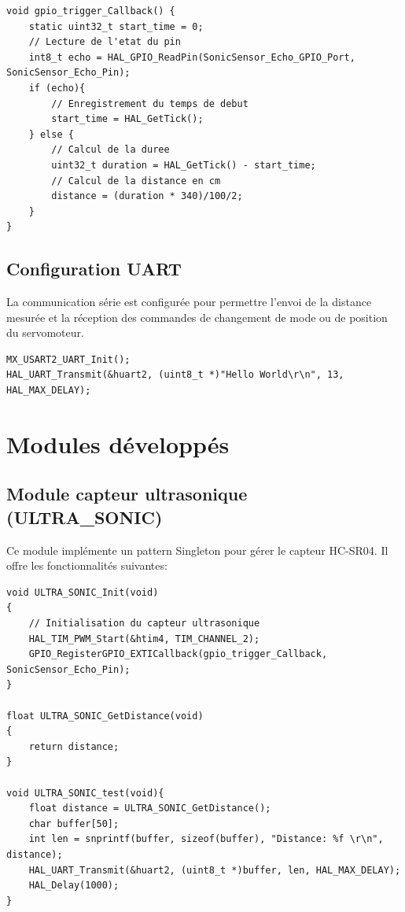 \documentclass{article}
\begin{document}
\begin{lstlisting}[caption={Callback d'interruption EXTI}, label={lst:exticallback}]
void gpio_trigger_Callback() {
    static uint32_t start_time = 0;
    // Lecture de l'etat du pin
    int8_t echo = HAL_GPIO_ReadPin(SonicSensor_Echo_GPIO_Port, SonicSensor_Echo_Pin);
    if (echo){
        // Enregistrement du temps de debut
        start_time = HAL_GetTick();
    } else {
        // Calcul de la duree
        uint32_t duration = HAL_GetTick() - start_time;
        // Calcul de la distance en cm
        distance = (duration * 340)/100/2;
    }
}
\end{lstlisting}

\subsection{Configuration UART}
La communication série est configurée pour permettre l'envoi de la distance mesurée et la réception des commandes de changement de mode ou de position du servomoteur.

\begin{lstlisting}[caption={Initialisation UART}, label={lst:uartinit}]
MX_USART2_UART_Init();
HAL_UART_Transmit(&huart2, (uint8_t *)"Hello World\r\n", 13, HAL_MAX_DELAY);
\end{lstlisting}


\section{Modules développés}

\subsection{Module capteur ultrasonique (ULTRA\_SONIC)}
Ce module implémente un pattern Singleton pour gérer le capteur HC-SR04. Il offre les fonctionnalités suivantes:

\begin{lstlisting}[caption={Module capteur ultrasonique}, label={lst:ultrasonicmodule}]
void ULTRA_SONIC_Init(void)
{
    // Initialisation du capteur ultrasonique
    HAL_TIM_PWM_Start(&htim4, TIM_CHANNEL_2);
    GPIO_RegisterGPIO_EXTICallback(gpio_trigger_Callback, SonicSensor_Echo_Pin);
}

float ULTRA_SONIC_GetDistance(void)
{
    return distance; 
}

void ULTRA_SONIC_test(void){
    float distance = ULTRA_SONIC_GetDistance();
    char buffer[50];
    int len = snprintf(buffer, sizeof(buffer), "Distance: %f \r\n", distance);
    HAL_UART_Transmit(&huart2, (uint8_t *)buffer, len, HAL_MAX_DELAY);
    HAL_Delay(1000);
}
\end{lstlisting}
\end{document}
